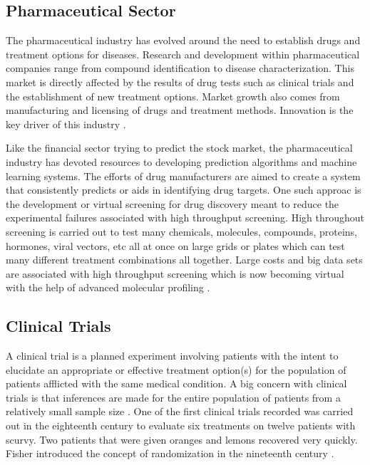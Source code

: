 \documentclass[sigconf]{acmart}
\begin{document}
\subsection{Pharmaceutical Sector}
The pharmaceutical industry has evolved around the need to establish drugs and treatment options for diseases. Research and development within pharmaceutical companies range from compound identification to disease characterization. This market is directly affected by the results of drug tests such as clinical trials and the establishment of new treatment options. Market growth also comes from manufacturing and licensing of drugs and treatment methods. Innovation is the key driver of this industry \cite{Gassmann}.

Like the financial sector trying to predict the stock market, the pharmaceutical industry has devoted resources to developing prediction algorithms and machine learning systems. The efforts of drug manufacturers are aimed to create a system that consistently predicts or aids in identifying drug targets. One such approac is the development or virtual screening for drug discovery meant to reduce the experimental failures associated with high throughput screening. High throughout screening is carried out to test many chemicals, molecules, compounds, proteins, hormones, viral vectors, etc all at once on large grids or plates which can test many different treatment combinations all together. Large costs and big data sets are associated with high throughput screening which is now becoming virtual with the help of advanced molecular profiling \cite{kitchen}.

\subsection{Clinical Trials}
A clinical trial is a planned experiment involving patients with the intent to elucidate an appropriate or effective treatment option(s) for the population of patients afflicted with the same medical condition. A big concern with clinical trials is that inferences are made for the entire population of patients from a relatively small sample size \cite{Pocock}. One of the first clinical trials recorded was carried out in the eighteenth century to evaluate six treatments on  twelve patients with scurvy. Two patients that were given oranges and lemons recovered very quickly. Fisher introduced the concept of randomization in the nineteenth century \cite{Friedman}.
\end{document}
